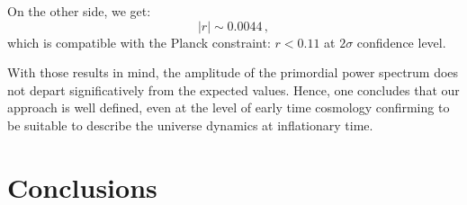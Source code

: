 \documentclass[nofootinbib,prd,superscriptaddress,showpacs,showkeys,]{revtex4}
\begin{document}
On the other side, we get:
\begin{equation}
|r|\sim 0.0044\,,\label{uno8}
\end{equation}
which is compatible with the Planck constraint: $r<0.11$ \cite{Planckdata,Planck2015} at $2\sigma$ confidence level.

With those results in mind, the amplitude of the primordial power spectrum does not depart significatively from the expected values. Hence,  one concludes that our approach is well defined, even at the level of early time cosmology confirming to be suitable to  describe the universe dynamics at inflationary  time.




\section{Conclusions}
\end{document}
